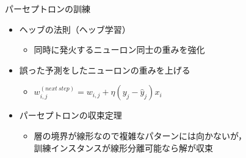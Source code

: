 \documentclass[aspectratio=169, dvipdfmx, 14pt, xcolor={svgnames,dvipsnames}]{beamer}
\def\tightlist{\itemsep1pt\parskip0pt\parsep0pt}
\begin{document}
\begin{frame}{\quad パーセプトロンの訓練}
  \begin{itemize}
    \item
          ヘッブの法則（ヘッブ学習）

          \begin{itemize}
            \tightlist
            \item
                  同時に発火するニューロン同士の重みを強化
          \end{itemize}
    \item
          誤った予測をしたニューロンの重みを上げる

          \begin{itemize}
            \tightlist
            \item
                  $w_{i,j}^{(next\ step)} = w_{i,j} + \eta(y_j - \hat{y}_j)x_i$
          \end{itemize}
    \item
          パーセプトロンの収束定理

          \begin{itemize}
            \tightlist
            \item
                  層の境界が線形なので複雑なパターンには向かないが，\\
                  訓練インスタンスが\alert{線形分離可能なら解が収束}
          \end{itemize}
  \end{itemize}
\end{frame}

\end{document}
